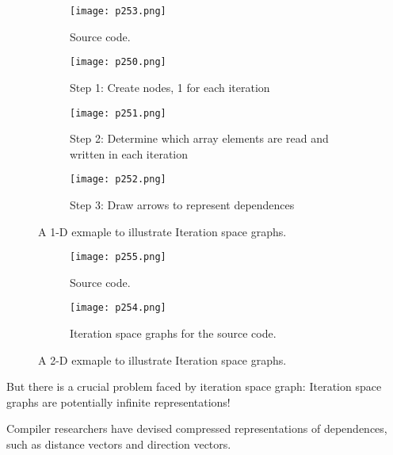 \begin{figure}[H]
    \centering
    \begin{subfigure}{0.6\textwidth}
    \centering
        \texttt{[image: p253.png]}
        \caption{Source code.}
        \label{fig:p253}
    \end{subfigure}
    \begin{subfigure}{0.6\textwidth}
    \centering
        \texttt{[image: p250.png]}
        \caption{Step 1: Create nodes, 1 for each iteration}
        \label{fig:p250}
    \end{subfigure}
    \begin{subfigure}{0.6\textwidth}
        \centering
            \texttt{[image: p251.png]}
            \caption{Step 2: Determine which array elements are read and
            written in each iteration}
            \label{fig:p251}
        \end{subfigure}
    \begin{subfigure}{0.6\textwidth}
            \centering
                \texttt{[image: p252.png]}
                \caption{Step 3: Draw arrows to represent dependences}
                \label{fig:p252}
    \end{subfigure}    
    \caption{A 1-D exmaple to illustrate Iteration space graphs.}
       \label{fig:p253}
\end{figure}



\begin{figure}[H]
    \centering
    \begin{subfigure}{0.5\textwidth}
    \centering
        \texttt{[image: p255.png]}
        \caption{Source code.}
        \label{fig:p255}
    \end{subfigure}
    \begin{subfigure}{0.5\textwidth}
    \centering
        \texttt{[image: p254.png]}
        \caption{Iteration space graphs for the source code.}
        \label{fig:p254}
    \end{subfigure}
  
    \caption{A 2-D exmaple to illustrate Iteration space graphs.}
       \label{fig:p254-5}
\end{figure}


But there is a crucial problem faced by iteration space graph: 
Iteration space graphs are potentially infinite representations!

Compiler researchers have devised compressed representations of dependences, such 
as distance vectors and direction vectors.

